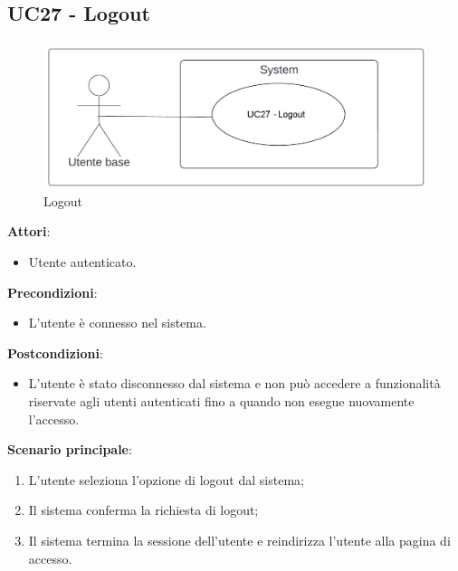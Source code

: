 \subsection{UC27 - Logout}\label{usecase:27}
\begin{figure}[H]
\centering
\includegraphics[width=0.75\linewidth]{ucd/UCD27.png}
\caption{Logout}
\end{figure}
\textbf{Attori}:
\begin{itemize}
    \item Utente autenticato.
\end{itemize}
\textbf{Precondizioni}:
\begin{itemize}
    \item L'utente è connesso nel sistema.
\end{itemize}
\textbf{Postcondizioni}:
\begin{itemize}
    \item L'utente è stato disconnesso dal sistema e non può accedere a funzionalità riservate agli utenti autenticati fino a quando non esegue nuovamente l'accesso.
\end{itemize}
\textbf{Scenario principale}:
\begin{enumerate}
    \item L'utente seleziona l'opzione di logout dal sistema;
    \item Il sistema conferma la richiesta di logout;
    \item Il sistema termina la sessione dell'utente e reindirizza l'utente alla pagina di accesso.
\end{enumerate}

\newpage